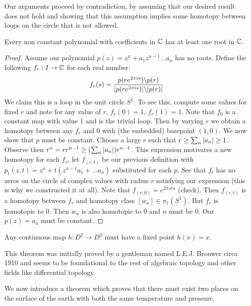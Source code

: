 \documentclass[10pt]{article}
\begin{document}
Our arguments proceed by contradiction, by assuming that our desired result does not hold and showing that this assumption implies some homotopy between loops on the circle that is not allowed.

\begin{theorem}
Every non constant polynomial with coefficients in $\mathbb{C}$ has at least one root in $\mathbb{C}$.
\end{theorem}

\begin{proof}
	Assume our polynomial $p(z) = z^n + a_1z^{n-1} ... a_n$ has no roots.
	Define the following $f_r: I \to \mathbb{C}$ for each real number:
	\[
		f_r(s) = \frac{p(re^{2\pi is}) \backslash p(r)}{\lvert p(re^{2\pi is})\rvert \backslash \lvert p(r)\rvert}
	\]
	We claim this is a loop in the unit circle $S^1$. To see this, compute some values for fixed $r$ and note for any value of $r$, $f_r(0) = 1$, $f_r(1) = 1$.
	Note that $f_0$ is a constant map with value $1$ and is the trivial loop. Then by varying $r$ we obtain a homotopy between any $f_r$ and $0$ with (the embedded) basepoint $(1, 0)$.
	\indent We now show that $p$ must be constant. Choose a large $r$ such that $r \geq \sum_n{\lvert a_n\rvert} \geq 1$. Observe then $r^n = rr^{n-1} \geq (\sum_n{\lvert a_n\rvert})r^{n-1}$.
	This expression motivates a new homotopy for each $f_r$, let $f_{(r, t)}$ be our previous definition with $p_t(z, t) = z^n + t(z^{n-1}a_1 + ... a_n)$ substituted for each $p$. See that $f_t$ has no zeros on the circle of complex values with radius $r$ satisfying our expression (this is why we constructed it at all).
	Note that $f_{(r, 0)} = e^{2\pi stn}$ (check). Then $f_{(r, t)}$ is a homotopy between $f_r$ and homotopy class $[w_n] \in \pi_1(S^1)$.  But $f_r$ is homotopic to $0$. Then $w_n$ is also homotopic to $0$ and $n$ must be 0. Our $p(z) = a_n$ must be constant.
\end{proof}

\begin{theorem}
	Any continuous map $h: D^2 \to D^2$ must have a fixed point $h(x) = x$.
\end{theorem}

This theorem was initially proved by a gentleman named L.E.J. Brouwer circa 1910 and seems to be foundational to the rest of algebraic topology and other fields like differential topology.

We now introduce a theorem which proves that there must exist two places on the surface of the earth with both the same temperature and pressure.
\end{document}

